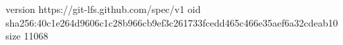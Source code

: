 version https://git-lfs.github.com/spec/v1
oid sha256:40c1e264d9606c1c28b966cb9ef3c261733fcedd465c466e35aef6a32cdeab10
size 11068
